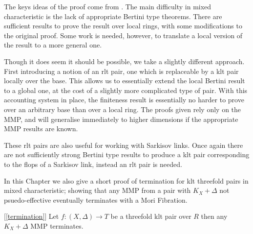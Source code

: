 \documentclass[a4paper,12pt]{book}
\begin{document}
	The keys ideas of the proof come from \cite{}. The main difficulty in mixed characteristic is the lack of appropriate Bertini type theorems. There are sufficient results to prove the result over local rings, with some modifications to the original proof. Some work is needed, however, to translate a local version of the result to a more general one. 
	
	Though it does seem it should be possible, we take a slightly different approach. First introducing a notion of an rlt pair, one which is replaceable by a klt pair locally over the base. This allows us to essentially extend the local Bertini result to a global one, at the cost of a slightly more complicated type of pair. With this accounting system in place, the finiteness result is essentially no harder to prove over an arbitrary base than over a local ring. The proofs given rely only on the MMP, and will generalise immediately to higher dimensions if the appropriate MMP results are known. 
	
	These rlt pairs are also useful for working with Sarkisov links. Once again there are not sufficiently strong Bertini type results to produce a klt pair corresponding to the flops of a Sarkisov link, instead an rlt pair is needed.
	
	In this Chapter we also give a short proof of termination for klt threefold pairs in mixed characteristic; showing that any MMP from a pair with $K_{X}+\Delta$ not psuedo-effective eventually terminates with a Mori Fibration.
	
	\begin{theo}\label{Main_Finite3}[\autoref{termination}]
		Let $f:(X,\Delta) \to T$ be a threefold klt pair over $R$ then any $K_{X}+\Delta$ MMP terminates.
	\end{theo}
	
	
	
	
	
	
	
	
	
	
	
\end{document}
